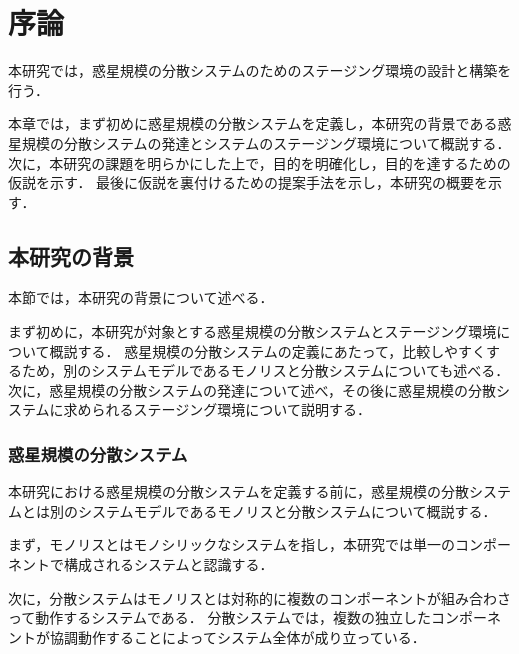 \chapter{序論}
\label{introduction}

本研究では，惑星規模の分散システムのためのステージング環境の設計と構築を行う．

本章では，まず初めに惑星規模の分散システムを定義し，本研究の背景である惑星規模の分散システムの発達とシステムのステージング環境について概説する．
次に，本研究の課題を明らかにした上で，目的を明確化し，目的を達するための仮説を示す．
最後に仮説を裏付けるための提案手法を示し，本研究の概要を示す．

\section{本研究の背景}
\label{introduction:background}

本節では，本研究の背景について述べる．

まず初めに，本研究が対象とする惑星規模の分散システムとステージング環境について概説する．
惑星規模の分散システムの定義にあたって，比較しやすくするため，別のシステムモデルであるモノリスと分散システムについても述べる．
次に，惑星規模の分散システムの発達について述べ，その後に惑星規模の分散システムに求められるステージング環境について説明する．

\subsection{惑星規模の分散システム}

本研究における惑星規模の分散システムを定義する前に，惑星規模の分散システムとは別のシステムモデルであるモノリスと分散システムについて概説する．

まず，モノリスとはモノシリックなシステムを指し，本研究では単一のコンポーネントで構成されるシステムと認識する．

次に，分散システムはモノリスとは対称的に複数のコンポーネントが組み合わさって動作するシステムである．
分散システムでは，複数の独立したコンポーネントが協調動作することによってシステム全体が成り立っている．

